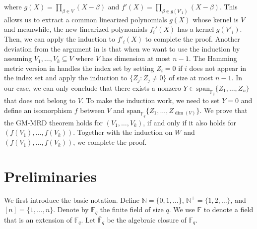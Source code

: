 \documentclass[11pt]{article}
\theoremstyle{plain}
\theoremstyle{definition}
\theoremstyle{remark}
\newcommand{\N}{\mathbb{N}}
\newcommand{\F}{\mathbb{F}}
\newcommand{\spa}{\mathrm{span}}
\begin{document}
where $g(X)=\prod_{\beta\in V}(X-\beta)$ and $f'(X)=\prod_{\beta\in g(V'_1)}(X-\beta)$. This allows us to extract a common linearized polynomials $g(X)$ whose kernel is $V$ and meanwhile, the new linearized polynomials $f_i'(X)$ has a kernel $g(V'_i)$. Then, we can apply the induction to $f'_i(X)$ to complete the proof. Another deviation from the argument in \cite{yildiz2019optimum} is that when we want to use the induction by assuming $V_1,\ldots,V_k\subseteq V$ where $V$ has dimension at most $n-1$. The Hamming metric version in \cite{yildiz2019optimum} handles the index set by setting $Z_i=0$ if $i$ does not appear in the index set and apply the induction to $\{Z_j:Z_j\neq 0\}$ of size at most $n-1$. In our case, we can only conclude that there exists a nonzero $Y\in \spa_{\F_q}\{Z_1,\ldots,Z_n\}$ that does not belong to $V$. To make the induction work, we need to set $Y=0$ and define an isomorphism $f$ between $V$ and $\spa_{\F_q}\{Z_1,\ldots,Z_{\dim(V)}\}$. We prove that the GM-MRD theorem holds for $(V_1,\ldots,V_k)$, if and only if it also holds for $(f(V_1),\ldots,f(V_k))$. Together with the induction on  $W$ and $(f(V_1),\ldots,f(V_k))$, we complete the proof.


\fi

\section{Preliminaries}\label{Prelim}
We first introduce the basic notation. 
Define $\N=\{0,1,\dots\}$, $\N^+=\{1,2,\dots\}$, and $[n]=\{1,\ldots,n\}$.
Denote by $\F_q$ the finite field of size $q$. We use $\F$ to denote a field that is an extension of $\F_q$. Let $\overline{\F}_q$ be the algebraic closure of $\F_q$. 
\end{document}
